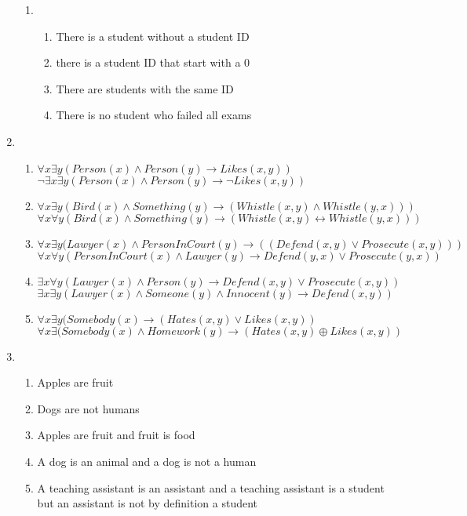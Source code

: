 \documentclass{article}
\begin{document}
\begin{enumerate}[label=(\alph*)]
\begin{enumerate}[label=(\alph*)]
        \item
        \begin{enumerate}[label=\roman*.]
          \item There is a student without a student ID
          \item there is a student ID that start with a 0
          \item There are students with the same ID
          \item There is no student who failed all exams
        \end{enumerate}
    \end{enumerate}
    
    \item
    \begin{enumerate}[label=\roman*.]
        \item $\forall x \exists y(Person(x) \wedge Person(y) \rightarrow Likes(x,y))$ \\
        $\neg \exists x \exists y(Person(x) \wedge Person(y) \rightarrow \neg Likes(x,y))$
        \item $\forall x \exists y(Bird(x) \wedge Something(y)  \rightarrow (Whistle(x,y) \wedge Whistle(y,x)))$ \\
        $\forall x \forall y(Bird(x) \wedge Something(y) \rightarrow (Whistle(x,y) \leftrightarrow Whistle(y,x)))$
        \item $\forall x \exists y(Lawyer(x) \wedge PersonInCourt(y) \rightarrow ((Defend(x,y) \vee Prosecute(x,y)))$ \\
        $\forall x \forall y(PersonInCourt(x) \wedge Lawyer(y) \rightarrow Defend(y,x) \vee Prosecute(y,x))$
        \item $\exists x \forall y (Lawyer(x) \wedge Person(y) \rightarrow Defend(x,y) \vee Prosecute(x,y))$ \\
        $\exists x \exists y (Lawyer(x) \wedge Someone(y) \wedge Innocent(y) \rightarrow Defend(x,y))$
        \item $\forall x \exists y(Somebody(x) \rightarrow (Hates(x,y) \vee Likes(x,y))$ \\
        $\forall x \exists (Somebody(x) \wedge Homework(y) \rightarrow (Hates(x,y) \oplus Likes(x,y))$
    \end{enumerate}
    
    \item 
    \begin{enumerate}[label=\roman*.]
        \item Apples are fruit
        \item Dogs are not humans
        \item Apples are fruit and fruit is food
        \item A dog is an animal and a dog is not a human
        \item A teaching assistant is an assistant and a teaching assistant is a student but an assistant is not by definition a student
    \end{enumerate}
    
\end{enumerate}
\end{document}
